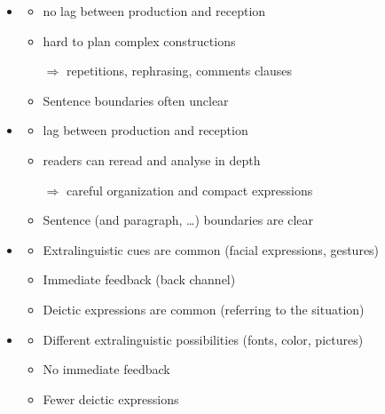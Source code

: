 \documentclass[a4paper,landscape,headrule,footrule,xetex]{foils}
\begin{document}

\begin{itemize}
\item {}

\begin{itemize}
\item no lag between production and reception
\item hard to plan complex constructions
\item[$\Rightarrow$] repetitions, rephrasing, comments clauses
\item Sentence boundaries often unclear
\end{itemize}
\item {}
\begin{itemize}
\item lag between production and reception
\item readers can reread and analyse in depth
\item[$\Rightarrow$] careful organization and compact expressions
\item Sentence (and paragraph, \ldots) boundaries are clear 
\end{itemize}
\end{itemize}



\begin{itemize}
\item {}

\begin{itemize}
\item Extralinguistic cues are common (facial expressions, gestures)
\item Immediate feedback (back channel)
\item Deictic expressions are common (referring to the situation)
\\ 
\end{itemize}
\item {}
\begin{itemize}
\item Different extralinguistic possibilities (fonts, color, pictures)
\item No immediate feedback
\item Fewer deictic expressions
\end{itemize}
\end{itemize}
\end{document}
